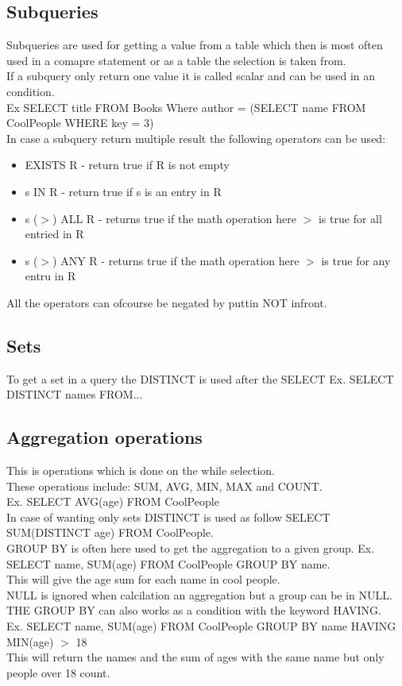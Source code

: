 \documentclass[12pt, a4paper]{article}
\begin{document}
		 \subsection{Subqueries}
		 	Subqueries are used for getting a value from a table which then is most often used in a comapre statement or as a table the selection is taken from.\\
		 	If a subquery only return one value it is called scalar and can be used in an condition.\\
		 	Ex SELECT title FROM Books Where author = (SELECT name FROM CoolPeople WHERE key = 3)\\
		 	In case a subquery return multiple result the following operators can be used:
		 	\begin{itemize}
		 		\item EXISTS R - return true if R is not empty
		 		\item s IN R - return true if s is an entry in R
		 		\item s ($>$) ALL R - returns true if the math operation here $>$ is true for all entried in R
		 		\item s ($>$) ANY R - returns true if the math operation here $>$ is true for any entru in R
			\end{itemize}
			All the operators can ofcourse be negated by puttin NOT infront.
		\subsection{Sets}
			To get a set in a query the DISTINCT is used after the SELECT Ex. SELECT DISTINCT names FROM...\\
		\subsection{Aggregation operations}
			This is operations which is done on the while selection.\\
			These operations include: SUM, AVG, MIN, MAX and COUNT.\\
			Ex. SELECT AVG(age) FROM CoolPeople\\
			In case of wanting only sets DISTINCT is used as follow SELECT SUM(DISTINCT age) FROM CoolPeople.\\
			GROUP BY is often here used to get the aggregation to a given group.
			Ex. SELECT name, SUM(age) FROM CoolPeople GROUP BY name.\\
			This will give the age sum for each name in cool people.\\
			NULL is ignored when calcilation an aggregation but a group can be in NULL.\\
			THE GROUP BY can also works as a condition with the keyword HAVING.\\
			Ex. SELECT name, SUM(age) FROM CoolPeople GROUP BY name HAVING MIN(age) $>$ 18\\
			This will return the names and the sum of ages with the same name but only people over 18 count.
			
\end{document}
